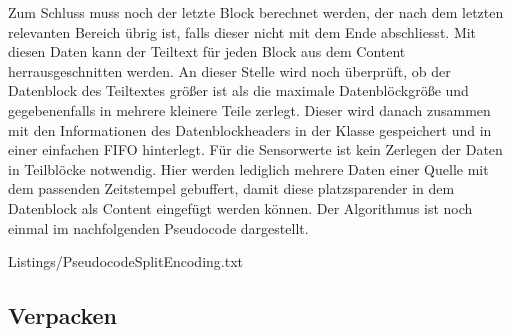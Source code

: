 Zum Schluss muss noch der letzte Block berechnet werden, der nach dem letzten
relevanten Bereich {\"u}brig ist, falls dieser nicht mit dem Ende abschliesst. Mit
diesen Daten kann der Teiltext f{\"u}r jeden Block aus dem Content
herrausgeschnitten werden. An dieser Stelle wird noch {\"u}berpr{\"u}ft, ob der
Datenblock des Teiltextes gr{\"o}{\ss}er ist als die maximale Datenbl{\"o}ckgr{\"o}{\ss}e und
gegebenenfalls in mehrere kleinere Teile zerlegt. Dieser wird danach zusammen
mit den Informationen des Datenblockheaders in der Klasse 
gespeichert und in einer einfachen \gls{FIFO} hinterlegt. F{\"u}r die Sensorwerte
ist kein Zerlegen der Daten in Teilbl{\"o}cke notwendig.
Hier werden lediglich mehrere Daten einer Quelle mit dem passenden
Zeitstempel gebuffert, damit diese platzsparender in dem Datenblock als
Content eingef{\"u}gt werden k{\"o}nnen. \newline
Der Algorithmus ist noch einmal im nachfolgenden Pseudocode dargestellt.

\lstset{language=pseudo}
\lstset{commentstyle=\textit}
 {Listings/PseudocodeSplitEncoding.txt}

\subsection{Verpacken}

